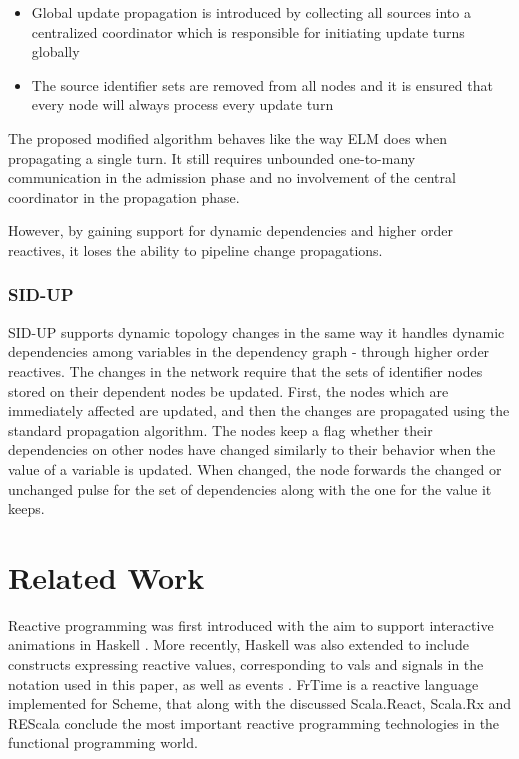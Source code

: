 \documentclass{sigplanconf}
\begin{document}
\begin{itemize}
\item Global update propagation is introduced by collecting all sources into a centralized coordinator which is responsible for initiating update turns globally
\item The source identifier sets are removed from all nodes and it is ensured that every node will always process every update turn
\end{itemize}

The proposed modified algorithm behaves like the way ELM does when propagating a single turn. It still requires unbounded one-to-many communication in the admission phase and no involvement of the central coordinator in the propagation phase.

However, by gaining support for dynamic dependencies and higher order reactives, it loses the ability to pipeline change propagations.

\subsubsection{SID-UP}
SID-UP \cite{sidup} supports dynamic topology changes in the same way it handles dynamic dependencies among variables in the dependency graph - through higher order reactives. The changes in the network require that the sets of identifier nodes stored on their dependent nodes be updated. First, the nodes which are immediately affected are updated, and then the changes are propagated using the standard propagation algorithm. The nodes keep a flag whether their dependencies on other nodes have changed similarly to their behavior when the value of a variable is updated. When changed, the node forwards the changed or unchanged pulse for the set of dependencies along with the one for the value it keeps.

\section{Related Work}
Reactive programming was first introduced with the aim to support interactive animations in Haskell \cite{haskell}. More recently, Haskell was also extended to include constructs expressing reactive values, corresponding to vals and signals in the notation used in this paper, as well as events \cite{haskell2} \cite{haskell3}. FrTime \cite{scheme} is a reactive language implemented for Scheme, that along with the discussed Scala.React, Scala.Rx and REScala conclude the most important reactive programming technologies in the functional programming world.
\end{document}

